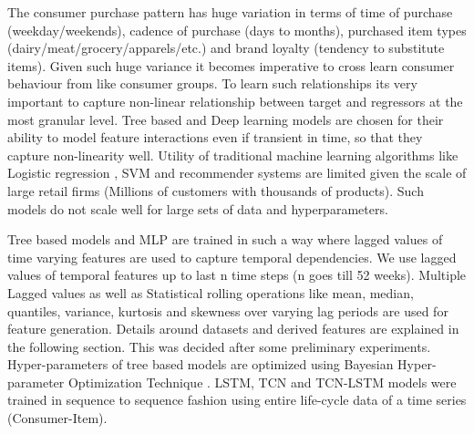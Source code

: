 The consumer purchase pattern has huge variation in terms of time of purchase (weekday/weekends), 
cadence of purchase (days to months), purchased item types (dairy/meat/grocery/apparels/etc.)
and brand loyalty (tendency to substitute items). Given such huge variance it becomes imperative 
to cross learn consumer behaviour from like consumer groups. To learn such relationships its very 
important to capture non-linear relationship between target and regressors at the most granular level.
Tree based and Deep learning models are chosen for their ability to model feature interactions even if transient in time, 
so that they capture non-linearity well. Utility of traditional machine learning algorithms like Logistic regression
, SVM and recommender systems are limited given the scale of large retail firms 
(Millions of customers with thousands of products). Such models do not scale well for large sets of data and hyperparameters.

Tree based models and MLP are trained in such a way where lagged values of time varying features are used
to capture temporal dependencies. We use lagged values of temporal features up to last n time steps (n goes till 52 weeks).
Multiple Lagged values as well as Statistical rolling operations like mean, median, quantiles, variance, kurtosis and 
skewness over varying lag periods are used for feature generation. Details around datasets and derived features are explained 
in the following section. This was decided after some preliminary experiments. Hyper-parameters of tree based models are optimized
using Bayesian Hyper-parameter Optimization Technique \cite{bergstra2013hyperopt}. LSTM, TCN and TCN-LSTM models were trained in sequence to sequence 
fashion \cite{sutskever2014sequence} using entire life-cycle data of a time series (Consumer-Item).

